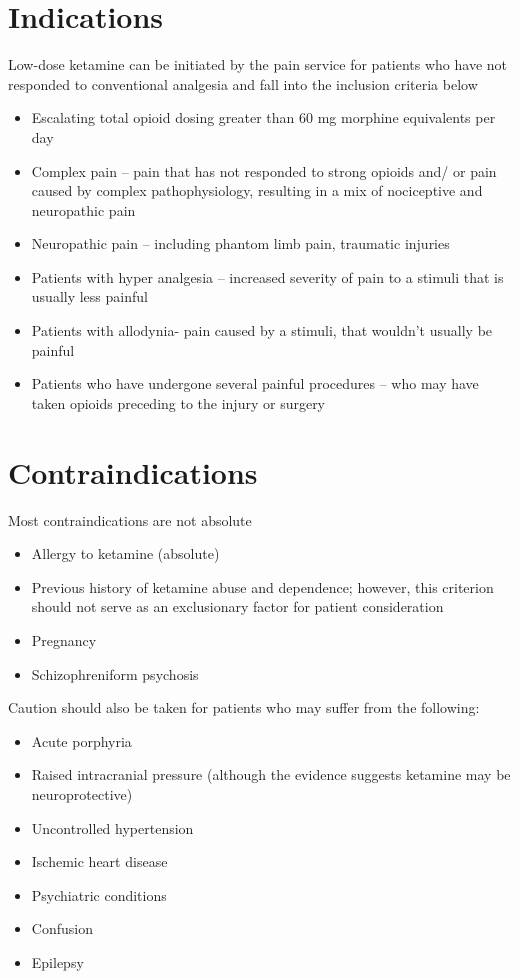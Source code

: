 \documentclass[
]{book}
\begin{document}
\hypertarget{indications}{%
\chapter{Indications}\label{indications}}

Low-dose ketamine can be initiated by the pain service for patients who have not responded to conventional analgesia and fall into the inclusion criteria below

\begin{itemize}
\item
  Escalating total opioid dosing greater than 60 mg morphine equivalents per day
\item
  Complex pain -- pain that has not responded to strong opioids and/ or pain caused by complex pathophysiology, resulting in a mix of nociceptive and neuropathic pain
\item
  Neuropathic pain -- including phantom limb pain, traumatic injuries
\item
  Patients with hyper analgesia -- increased severity of pain to a stimuli that is usually less painful
\item
  Patients with allodynia- pain caused by a stimuli, that wouldn't usually be painful
\item
  Patients who have undergone several painful procedures -- who may have taken opioids preceding to the injury or surgery
\end{itemize}

\hypertarget{contraindications}{%
\chapter{Contraindications}\label{contraindications}}

Most contraindications are not absolute

\begin{itemize}
\item
  Allergy to ketamine (absolute)
\item
  Previous history of ketamine abuse and dependence; however, this criterion should not serve as an exclusionary factor for patient consideration
\item
  Pregnancy
\item
  Schizophreniform psychosis
\end{itemize}

Caution should also be taken for patients who may suffer from the following:

\begin{itemize}
\item
  Acute porphyria
\item
  Raised intracranial pressure (although the evidence suggests ketamine may be neuroprotective)
\item
  Uncontrolled hypertension
\item
  Ischemic heart disease
\item
  Psychiatric conditions
\item
  Confusion
\item
  Epilepsy
\end{itemize}
\end{document}
